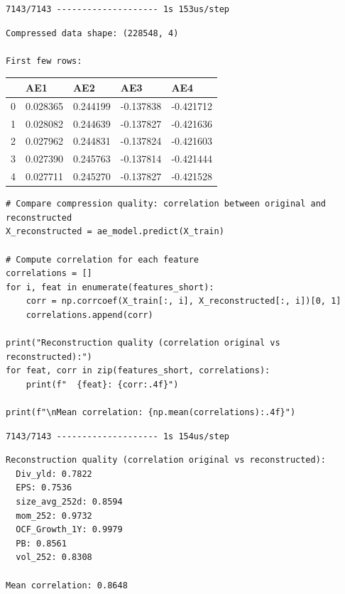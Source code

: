 \begin{verbatim}
7143/7143 -------------------- 1s 153us/step
\end{verbatim}

\begin{verbatim}
Compressed data shape: (228548, 4)

First few rows:
\end{verbatim}

\bigskip\noindent
\begin{tabular}{p{}p{}p{}p{}p{}}
\toprule
 & AE1 & AE2 & AE3 & AE4 \\
\hline
0 & 0.028365 & 0.244199 & -0.137838 & -0.421712 \\
\hline
1 & 0.028082 & 0.244639 & -0.137827 & -0.421636 \\
\hline
2 & 0.027962 & 0.244831 & -0.137824 & -0.421603 \\
\hline
3 & 0.027390 & 0.245763 & -0.137814 & -0.421444 \\
\hline
4 & 0.027711 & 0.245270 & -0.137827 & -0.421528 \\
\hline
\bottomrule
\end{tabular}

\bigskip

\begin{verbatim}
# Compare compression quality: correlation between original and reconstructed
X_reconstructed = ae_model.predict(X_train)

# Compute correlation for each feature
correlations = []
for i, feat in enumerate(features_short):
    corr = np.corrcoef(X_train[:, i], X_reconstructed[:, i])[0, 1]
    correlations.append(corr)

print("Reconstruction quality (correlation original vs reconstructed):")
for feat, corr in zip(features_short, correlations):
    print(f"  {feat}: {corr:.4f}")

print(f"\nMean correlation: {np.mean(correlations):.4f}")
\end{verbatim}

\begin{verbatim}
7143/7143 -------------------- 1s 154us/step
\end{verbatim}

\begin{verbatim}
Reconstruction quality (correlation original vs reconstructed):
  Div_yld: 0.7822
  EPS: 0.7536
  size_avg_252d: 0.8594
  mom_252: 0.9732
  OCF_Growth_1Y: 0.9979
  PB: 0.8561
  vol_252: 0.8308

Mean correlation: 0.8648
\end{verbatim}